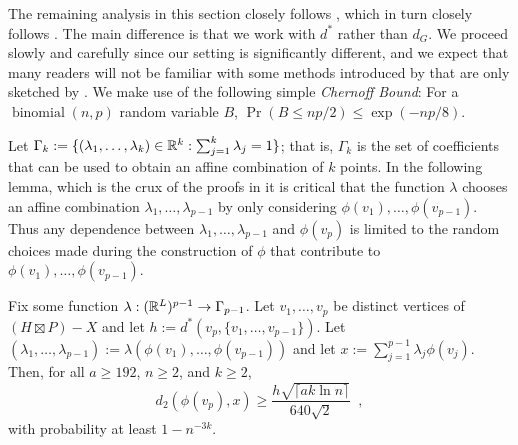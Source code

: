 \documentclass{patmorin}
\renewcommand{\ge}{\geqslant}
\renewcommand{\le}{\leqslant}
\newcommand{\defin}[1]{\emph{\textcolor{brightmaroon}{#1}}}
\begin{document}
The remaining analysis in this section closely follows \citet{rao:small}, which in turn closely follows \citet{feige:approximating}.  The main difference is that we work with $d^*$ rather than $d_G$.  We proceed slowly and carefully since our setting is significantly different, and we expect that many readers will not be familiar with some methods introduced by \citet{feige:approximating} that are only sketched by \citet{rao:small}. We make use of the following simple \defin{Chernoff Bound}:  For a $\operatorname{binomial}(n,p)$ random variable $B$, $\Pr(B \le np/2) \le \exp(-np/8)$.

Let $\Gamma_k:=\{(\lambda_1,\ldots,\lambda_k)\in \mathbb{R}^k:\sum_{j=1}^k\lambda_j=1\}$; that is, $\Gamma_k$ is the set of coefficients that can be used to obtain an affine combination of $k$ points.  In the following lemma, which is the crux of the proofs in \cite{rao:small,feige:approximating} it is critical that the function $\lambda$ chooses an affine combination $\lambda_1,\ldots,\lambda_{p-1}$ by only considering $\phi(v_1),\ldots,\phi(v_{p-1})$.  Thus any dependence between $\lambda_1,\ldots,\lambda_{p-1}$ and $\phi(v_p)$ is limited to the random choices made during the construction of $\phi$ that contribute to $\phi(v_1),\ldots,\phi(v_{p-1})$.


\begin{clm}\label{crux}
  Fix some function $\lambda:(\mathbb{R}^{L})^{p-1}\to \Gamma_{p-1}$.
  Let $v_1,\ldots,v_p$ be distinct vertices of $(H\boxtimes P)-X$ and let $h:=d^*(v_p,\{v_1,\ldots,v_{p-1}\})$.  Let $(\lambda_1,\ldots,\lambda_{p-1}):=\lambda(\phi(v_1),\ldots,\phi(v_{p-1}))$ and let $x:=\sum_{j=1}^{p-1}\lambda_j\phi(v_j)$.
  Then, for all $a\ge 192$, $n\ge 2$, and $k\ge 2$,
  \[
    d_2(\phi(v_p),x)\ge \frac{h\sqrt{\lceil ak\ln n\rceil}}{640\sqrt{2}} \enspace ,
  \]
  with probability at least $1-n^{-3k}$.
\end{clm}
\end{document}
